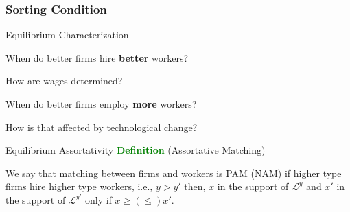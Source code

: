 \documentclass[notes,11pt, aspectratio=169]{beamer}
\newenvironment{wideitemize}{\itemize\addtolength{\itemsep}{10pt}}{\enditemize}
\begin{document}
\subsubsection{Sorting Condition}
\begin{frame}{Equilibrium Characterization}
	\begin{wideitemize}
		\item  When do better firms hire \textbf{better} workers?
		\item  How are wages determined?
		\item  When do better firms employ \textbf{more} workers?
		\item  How is that affected by technological change?
	\end{wideitemize}
	
\end{frame}

\begin{frame}{Equilibrium Assortativity}
	\textcolor{green}{\textbf{Definition}} (Assortative Matching) 
	\begin{wideitemize}
	\item We say that matching between firms and workers is PAM (NAM) if higher type firms hire higher type workers, i.e., $y>y'$ then, $x$ in the support of $\mathcal{L}^y$ and $x'$ in the support of $\mathcal{L}^{y'}$ only if $x\geq (\leq) x'$.
	\end{wideitemize}
\end{frame}
\end{document}
